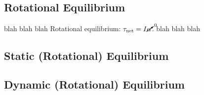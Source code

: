 \documentclass[11pt,letter,openany,makeidx]{book}
\begin{document}
\subsection{Rotational Equilibrium}

blah blah blah
\label{ss:roteq} Rotational equilibrium: $\tau_\mathrm{net} = I \cancelto{0}{\alpha}$.  blah blah blah

\subsection{Static (Rotational) Equilibrium}

\subsection{Dynamic (Rotational) Equilibrium}
\end{document}
